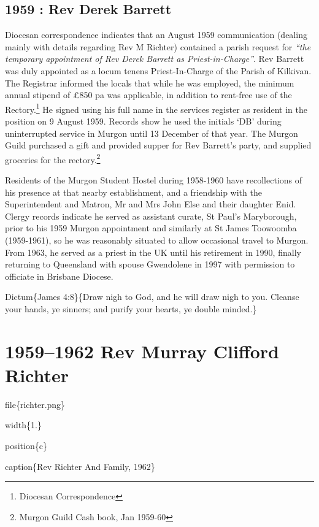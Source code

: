 \hypertarget{rev-derek-barrett}{%
\section{1959 : Rev Derek Barrett}\label{rev-derek-barrett}}

Diocesan correspondence indicates that an August 1959 communication (dealing mainly with details regarding Rev M Richter) contained a parish request for \emph{``the temporary appointment of Rev Derek Barrett as Priest-in-Charge''}. Rev Barrett was duly appointed as a locum tenens Priest-In-Charge of the Parish of Kilkivan. The Registrar informed the locals that while he was employed, the minimum annual stipend of £850 pa was applicable, in addition to rent-free use of the Rectory.\footnote{Diocesan Correspondence} He signed using his full name in the services register as resident in the position on 9 August 1959. Records show he used the initials `DB' during uninterrupted service in Murgon until 13 December of that year. The Murgon Guild purchased a gift and provided supper for Rev Barrett's party, and supplied groceries for the rectory.\footnote{Murgon Guild Cash book, Jan 1959-60}

Residents of the Murgon Student Hostel during 1958-1960 have recollections of his presence at that nearby establishment, and a friendship with the Superintendent and Matron, Mr and Mrs John Else and their daughter Enid. Clergy records indicate he served as assistant curate, St Paul's Maryborough, prior to his 1959 Murgon appointment and similarly at St James Toowoomba (1959-1961), so he was reasonably situated to allow occasional travel to Murgon. From 1963, he served as a priest in the UK until his retirement in 1990, finally returning to Queensland with spouse Gwendolene in 1997 with permission to officiate in Brisbane Diocese.

Dictum\{James 4:8\}\{Draw nigh to God, and he will draw nigh to you. Cleanse your hands, ye sinners; and purify your hearts, ye double minded.\}

\hypertarget{rev-murray-clifford-richter}{%
\chapter{1959--1962 Rev Murray Clifford Richter}\label{rev-murray-clifford-richter}}

file\{richter.png\}

width\{1.\}

position\{c\}

caption\{Rev Richter And Family, 1962\}

